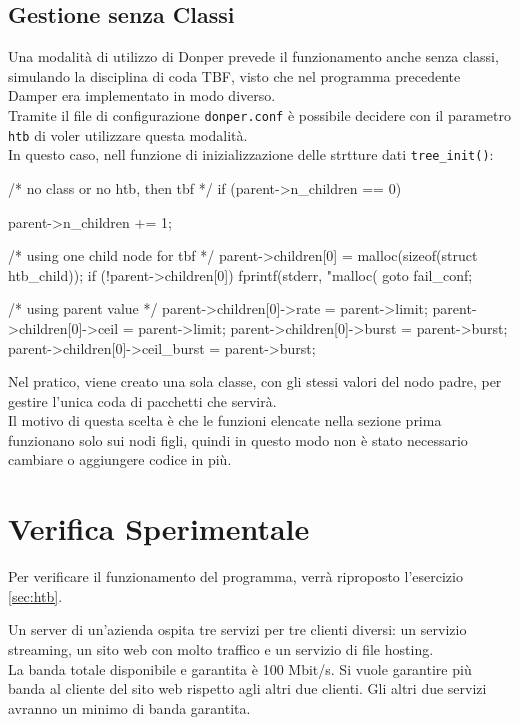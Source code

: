 \subsection{Gestione senza Classi}
Una modalità di utilizzo di Donper prevede il funzionamento anche senza classi, simulando la disciplina di coda TBF, visto che nel programma precedente Damper era implementato in modo diverso. \\
\vspace*{0.01\textheight}
Tramite il file di configurazione \texttt{donper.conf} è possibile decidere con il parametro \texttt{htb} di voler utilizzare questa modalità. \\ 
In questo caso, nell funzione di inizializzazione delle strtture dati \texttt{tree\_init()}:
\begin{clang}
/* no class or no htb, then tbf */
if (parent->n_children == 0) {
  parent->n_children += 1;

  /* using one child node for tbf */
  parent->children[0] = malloc(sizeof(struct htb_child));
  if (!parent->children[0]) {
		  fprintf(stderr, "malloc(%
		  goto fail_conf;
}

  /* using parent value */
  parent->children[0]->rate = parent->limit;
  parent->children[0]->ceil = parent->limit;
  parent->children[0]->burst = parent->burst;
  parent->children[0]->ceil_burst = parent->burst;
}
\end{clang}
Nel pratico, viene creato una sola classe, con gli stessi valori del nodo padre, per gestire l'unica coda di pacchetti che servirà.\\ 
Il motivo di questa scelta è che le funzioni elencate nella sezione prima funzionano solo sui nodi figli, quindi in questo modo non è stato necessario cambiare o aggiungere codice in più.

\section{Verifica Sperimentale}
Per verificare il funzionamento del programma, verrà riproposto l'esercizio \ref{sec:htb}.
\begin{note}[Scenario]
  Un server di un'azienda ospita tre servizi per tre clienti diversi: un servizio streaming, un sito web con molto traffico e un servizio di file hosting. \\ 
  La banda totale disponibile e garantita è 100 Mbit/s. Si vuole garantire più banda al cliente del sito web rispetto agli altri due clienti.
  Gli altri due servizi avranno un minimo di banda garantita.
\end{note}


